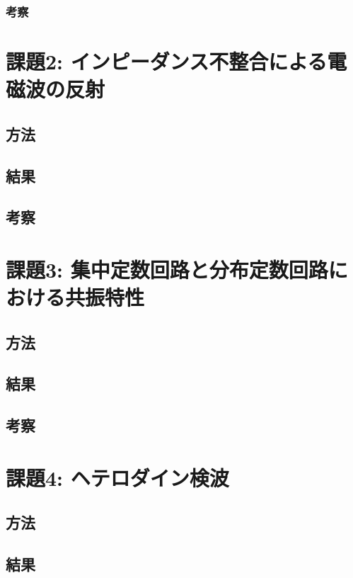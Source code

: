 \documentclass[uplatex,dvipdfmx,a4j,12pt]{jsarticle}
\begin{document}
\subsubsection{考察}


\section{課題2: インピーダンス不整合による電磁波の反射}
\subsection{方法}

\subsection{結果}

\subsection{考察}


\section{課題3: 集中定数回路と分布定数回路における共振特性}
\subsection{方法}

\subsection{結果}

\subsection{考察}


\section{課題4: ヘテロダイン検波}
\subsection{方法}

\subsection{結果}
\end{document}
